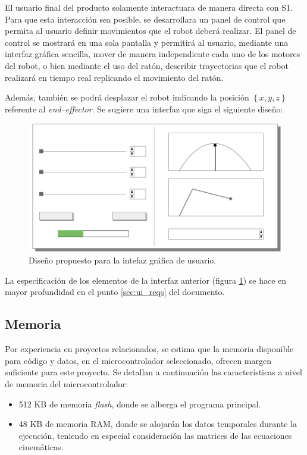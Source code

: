 El usuario final del producto solamente interactuara de manera directa con \ac{S1}.
Para que esta interacción sea posible, se desarrollara un panel de control que permita al usuario definir movimientos que el robot deberá realizar. El panel de control se mostrará en una sola pantalla y permitirá al usuario, mediante una interfaz gráfica sencilla, mover de manera independiente cada uno de los motores del robot, o bien mediante el uso del ratón, describir trayectorias que el robot realizará en tiempo real replicando el movimiento del ratón.

Además, también se podrá desplazar el robot indicando la posición $\left\{x, y, z\right\}$ referente al \textit{end--effector}. Se sugiere una interfaz que siga el siguiente diseño:

\begin{figure}[H]
    \centering
    \includegraphics[width=\linewidth]{RS/images/InterfaceSketch-MkII.png}
    \caption{Diseño propuesto para la intefaz gráfica de usuario.}
    \label{fig:ui_design}
\end{figure}

La especificación de los elementos de la interfaz anterior (figura \ref{fig:ui_design}) se hace en mayor profundidad en el punto \ref{sec:ui_reqs} del documento.

\subsection{Memoria}

Por experiencia en proyectos relacionados, se estima que la memoria disponible para 
código y datos, en el microcontrolador seleccionado, ofrecen margen suficiente para este
proyecto. Se detallan a continuación las características a nivel de memoria del
microcontrolador:

\begin{itemize}
    \item 512 KB de memoria \textit{flash}, donde se alberga el programa principal.
    \item 48 KB de memoria \ac{RAM}, donde se alojarán los datos temporales durante la ejecución, teniendo en especial consideración las matrices de las ecuaciones cinemáticas.
\end{itemize}

